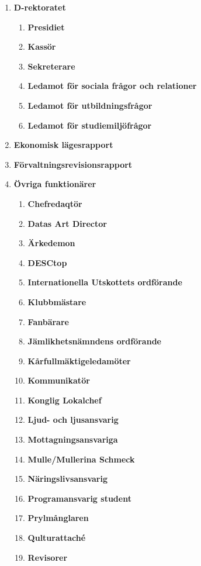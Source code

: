 \documentclass{dagordning}
\begin{document}
  \begin{enumerate}
    \item \textbf{D-rektoratet}
      \begin{enumerate}
        \item \textbf{Presidiet}
        \item \textbf{Kassör}
        \item \textbf{Sekreterare}
        \item \textbf{Ledamot för sociala frågor och relationer}
        \item \textbf{Ledamot för utbildningsfrågor}
        \item \textbf{Ledamot för studiemiljöfrågor}
      \end{enumerate}
    \item \textbf{Ekonomisk lägesrapport}
    \item \textbf{Förvaltningsrevisionsrapport}
    \item \textbf{Övriga funktionärer}
      \begin{enumerate}
      	\item \textbf{Chefredaqtör}
      	\item \textbf{Datas Art Director}
        \item \textbf{Ärkedemon}
        \item \textbf{DESCtop}
        \item \textbf{Internationella Utskottets ordförande}
        \item \textbf{Klubbmästare}
        \item \textbf{Fanbärare}
        \item \textbf{Jämlikhetsnämndens ordförande}
        \item \textbf{Kårfullmäktigeledamöter}
        \item \textbf{Kommunikatör}
        \item \textbf{Konglig Lokalchef}
        \item \textbf{Ljud- och ljusansvarig}
        \item \textbf{Mottagningsansvariga}
        \item \textbf{Mulle/Mullerina Schmeck}
        \item \textbf{Näringslivsansvarig}
        \item \textbf{Programansvarig student}
        \item \textbf{Prylmånglaren}
        \item \textbf{Qulturattaché}
        \item \textbf{Revisorer}

\end{enumerate}
\end{enumerate}
\end{document}
